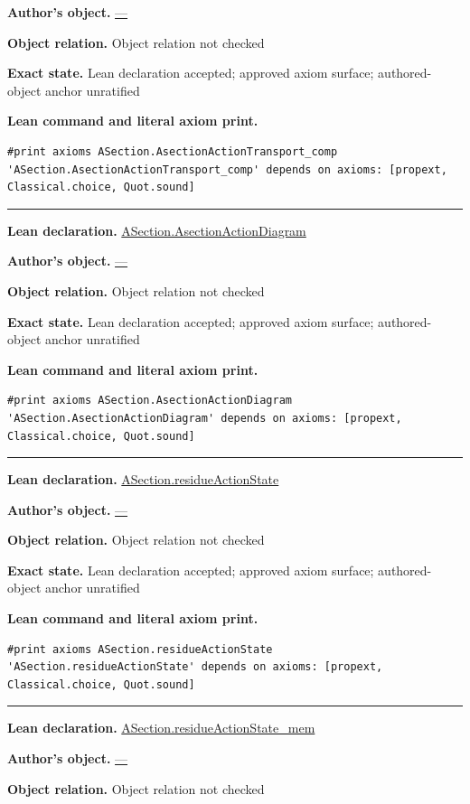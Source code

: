 \documentclass[11pt]{article}
\theoremstyle{plain}
\theoremstyle{definition}
\theoremstyle{remark}
\begin{document}
\begin{tcolorbox}
\par\textbf{Author's object.} \url{—}
\par\textbf{Object relation.} Object relation not checked
\par\textbf{Exact state.} Lean declaration accepted; approved axiom surface; authored-object anchor unratified
\par\smallskip\textbf{Lean command and literal axiom print.}
\begin{Verbatim}[breaklines=true,breakanywhere=true,fontsize=\small]
#print axioms ASection.AsectionActionTransport_comp
'ASection.AsectionActionTransport_comp' depends on axioms: [propext, Classical.choice, Quot.sound]
\end{Verbatim}
\medskip\hrule\medskip
\textbf{Lean declaration.} \url{ASection.AsectionActionDiagram}
\par\textbf{Author's object.} \url{—}
\par\textbf{Object relation.} Object relation not checked
\par\textbf{Exact state.} Lean declaration accepted; approved axiom surface; authored-object anchor unratified
\par\smallskip\textbf{Lean command and literal axiom print.}
\begin{Verbatim}[breaklines=true,breakanywhere=true,fontsize=\small]
#print axioms ASection.AsectionActionDiagram
'ASection.AsectionActionDiagram' depends on axioms: [propext, Classical.choice, Quot.sound]
\end{Verbatim}
\medskip\hrule\medskip
\textbf{Lean declaration.} \url{ASection.residueActionState}
\par\textbf{Author's object.} \url{—}
\par\textbf{Object relation.} Object relation not checked
\par\textbf{Exact state.} Lean declaration accepted; approved axiom surface; authored-object anchor unratified
\par\smallskip\textbf{Lean command and literal axiom print.}
\begin{Verbatim}[breaklines=true,breakanywhere=true,fontsize=\small]
#print axioms ASection.residueActionState
'ASection.residueActionState' depends on axioms: [propext, Classical.choice, Quot.sound]
\end{Verbatim}
\medskip\hrule\medskip
\textbf{Lean declaration.} \url{ASection.residueActionState_mem}
\par\textbf{Author's object.} \url{—}
\par\textbf{Object relation.} Object relation not checked

\end{tcolorbox}
\end{document}
